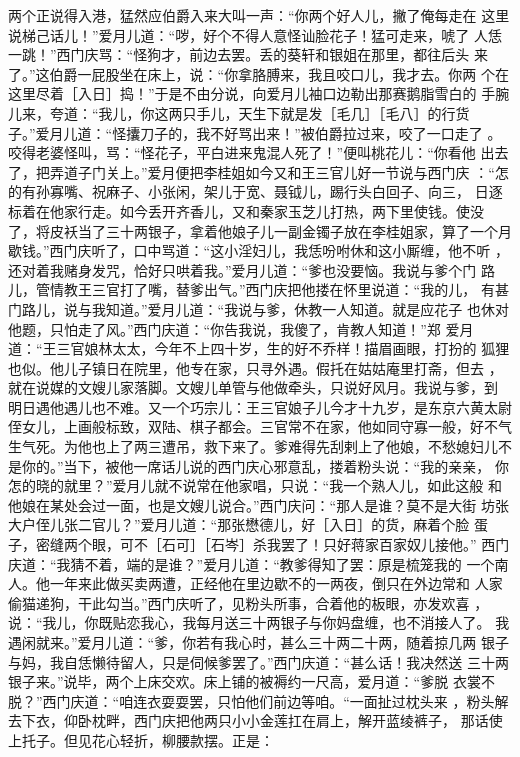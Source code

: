 两个正说得入港，猛然应伯爵入来大叫一声：“你两个好人儿，撇了俺每走在
这里说梯己话儿！”爱月儿道：“哕，好个不得人意怪讪脸花子！猛可走来，唬了
人恁一跳！”西门庆骂：“怪狗才，前边去罢。丢的葵轩和银姐在那里，都往后头
来了。”这伯爵一屁股坐在床上，说：“你拿胳膊来，我且咬口儿，我才去。你两
个在这里尽着［入日］捣！”于是不由分说，向爱月儿袖口边勒出那赛鹅脂雪白的
手腕儿来，夸道：“我儿，你这两只手儿，天生下就是发［毛几］［毛八］的行货
子。”爱月儿道：“怪攮刀子的，我不好骂出来！”被伯爵拉过来，咬了一口走了
。咬得老婆怪叫，骂：“怪花子，平白进来鬼混人死了！”便叫桃花儿：“你看他
出去了，把弄道子门关上。”爱月便把李桂姐如今又和王三官儿好一节说与西门庆
：“怎的有孙寡嘴、祝麻子、小张闲，架儿于宽、聂钺儿，踢行头白回子、向三，
日逐标着在他家行走。如今丢开齐香儿，又和秦家玉芝儿打热，两下里使钱。使没
了，将皮袄当了三十两银子，拿着他娘子儿一副金镯子放在李桂姐家，算了一个月
歇钱。”西门庆听了，口中骂道：“这小淫妇儿，我恁吩咐休和这小厮缠，他不听
，还对着我赌身发咒，恰好只哄着我。”爱月儿道：“爹也没要恼。我说与爹个门
路儿，管情教王三官打了嘴，替爹出气。”西门庆把他搂在怀里说道：“我的儿，
有甚门路儿，说与我知道。”爱月儿道：“我说与爹，休教一人知道。就是应花子
也休对他题，只怕走了风。”西门庆道：“你告我说，我傻了，肯教人知道！”郑
爱月道：“王三官娘林太太，今年不上四十岁，生的好不乔样！描眉画眼，打扮的
狐狸也似。他儿子镇日在院里，他专在家，只寻外遇。假托在姑姑庵里打斋，但去
，就在说媒的文嫂儿家落脚。文嫂儿单管与他做牵头，只说好风月。我说与爹，到
明日遇他遇儿也不难。又一个巧宗儿：王三官娘子儿今才十九岁，是东京六黄太尉
侄女儿，上画般标致，双陆、棋子都会。三官常不在家，他如同守寡一般，好不气
生气死。为他也上了两三遭吊，救下来了。爹难得先刮剌上了他娘，不愁媳妇儿不
是你的。”当下，被他一席话儿说的西门庆心邪意乱，搂着粉头说：“我的亲亲，
你怎的晓的就里？”爱月儿就不说常在他家唱，只说：“我一个熟人儿，如此这般
和他娘在某处会过一面，也是文嫂儿说合。”西门庆问：“那人是谁？莫不是大街
坊张大户侄儿张二官儿？”爱月儿道：“那张懋德儿，好［入日］的货，麻着个脸
蛋子，密缝两个眼，可不［石可］［石岑］杀我罢了！只好蒋家百家奴儿接他。”
西门庆道：“我猜不着，端的是谁？”爱月儿道：“教爹得知了罢：原是梳笼我的
一个南人。他一年来此做买卖两遭，正经他在里边歇不的一两夜，倒只在外边常和
人家偷猫递狗，干此勾当。”西门庆听了，见粉头所事，合着他的板眼，亦发欢喜
，说：“我儿，你既贴恋我心，我每月送三十两银子与你妈盘缠，也不消接人了。
我遇闲就来。”爱月儿道：“爹，你若有我心时，甚么三十两二十两，随着掠几两
银子与妈，我自恁懒待留人，只是伺候爹罢了。”西门庆道：“甚么话！我决然送
三十两银子来。”说毕，两个上床交欢。床上铺的被褥约一尺高，爱月道：“爹脱
衣裳不脱？”西门庆道：“咱连衣耍耍罢，只怕他们前边等咱。“一面扯过枕头来
，粉头解去下衣，仰卧枕畔，西门庆把他两只小小金莲扛在肩上，解开蓝绫裤子，
那话使上托子。但见花心轻折，柳腰款摆。正是：

